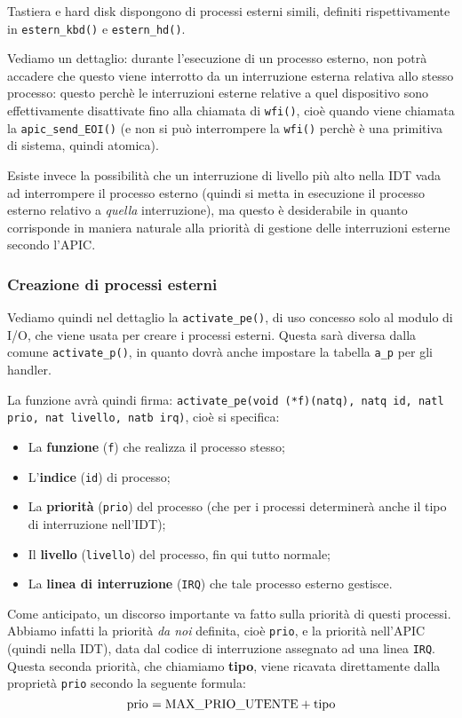 \documentclass[a4paper,11pt]{article}
\begin{document}
Tastiera e hard disk dispongono di processi esterni simili, definiti rispettivamente in \lstinline|estern_kbd()| e \lstinline|estern_hd()|.

Vediamo un dettaglio: durante l'esecuzione di un processo esterno, non potrà accadere che questo viene interrotto da un interruzione esterna relativa allo stesso processo: questo perchè le interruzioni esterne relative a quel dispositivo sono effettivamente disattivate fino alla chiamata di \lstinline|wfi()|, cioè quando viene chiamata la \lstinline|apic_send_EOI()| (e non si può interrompere la \lstinline|wfi()| perchè è una primitiva di sistema, quindi atomica).

Esiste invece la possibilità che un interruzione di livello più alto nella IDT vada ad interrompere il processo esterno (quindi si metta in esecuzione il processo esterno relativo a \textit{quella} interruzione), ma questo è desiderabile in quanto corrisponde in maniera naturale alla priorità di gestione delle interruzioni esterne secondo l'APIC.

\subsubsection{Creazione di processi esterni}
Vediamo quindi nel dettaglio la \lstinline|activate_pe()|, di uso concesso solo al modulo di I/O, che viene usata per creare i processi esterni.
Questa sarà diversa dalla comune \lstinline|activate_p()|, in quanto dovrà anche impostare la tabella \lstinline|a_p| per gli handler.

La funzione avrà quindi firma: \lstinline|activate_pe(void (*f)(natq), natq id, natl prio, nat livello, natb irq)|, cioè si specifica:
\begin{itemize}
	\item La \textbf{funzione} (\lstinline|f|) che realizza il processo stesso;
	\item L'\textbf{indice} (\lstinline|id|) di processo;
	\item La \textbf{priorità} (\lstinline|prio|) del processo (che per i processi determinerà anche il tipo di interruzione nell'IDT);
	\item Il \textbf{livello} (\lstinline|livello|) del processo, fin qui tutto normale;
	\item La \textbf{linea di interruzione} (\lstinline|IRQ|) che tale processo esterno gestisce.
\end{itemize}

Come anticipato, un discorso importante va fatto sulla priorità di questi processi.
Abbiamo infatti la priorità \textit{da noi} definita, cioè \lstinline|prio|, e la priorità nell'APIC (quindi nella IDT), data dal codice di interruzione assegnato ad una linea \lstinline|IRQ|.
Questa seconda priorità, che chiamiamo \textbf{tipo}, viene ricavata direttamente dalla proprietà \lstinline|prio| secondo la seguente formula:
$$
\text{\lstinline|prio|} = \text{\lstinline|MAX_PRIO_UTENTE|} + \text{\lstinline|tipo|}
$$
\end{document}
